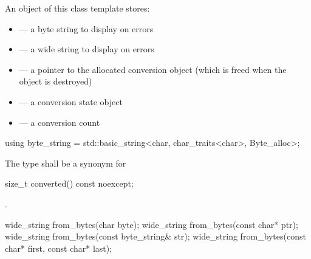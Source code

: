 \pnum
An object of this class template stores:

\begin{itemize}
\item {} --- a byte string to display on errors
\item {} --- a wide string to display on errors
\item {} --- a pointer to the allocated conversion object
(which is freed when the  object is destroyed)
\item {} --- a conversion state object
\item {} --- a conversion count
\end{itemize}

%
\begin{itemdecl}
using byte_string = std::basic_string<char, char_traits<char>, Byte_alloc>;
\end{itemdecl}

\begin{itemdescr}
\pnum
The type shall be a synonym for 
\end{itemdescr}

%
\begin{itemdecl}
size_t converted() const noexcept;
\end{itemdecl}

\begin{itemdescr}
\pnum
\returns {}.
\end{itemdescr}

%
\begin{itemdecl}
wide_string from_bytes(char byte);
wide_string from_bytes(const char* ptr);
wide_string from_bytes(const byte_string& str);
wide_string from_bytes(const char* first, const char* last);
\end{itemdecl}

